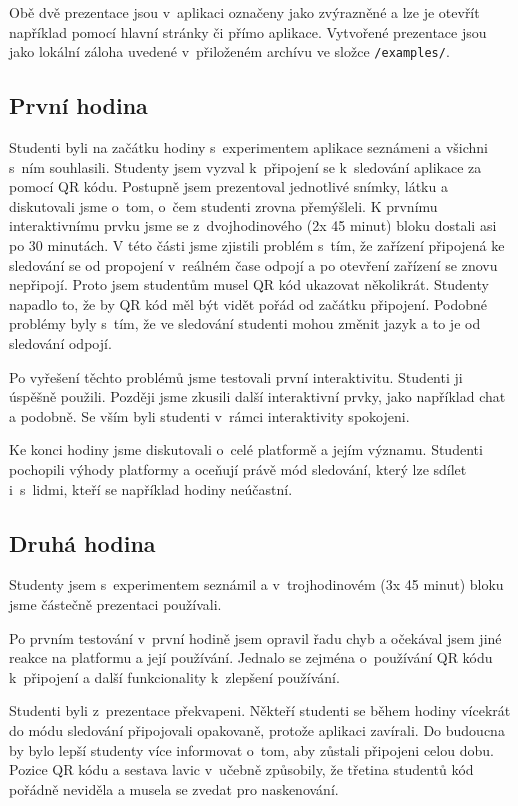 Obě dvě prezentace jsou v~aplikaci označeny jako zvýrazněné a lze je otevřít například pomocí hlavní stránky či přímo aplikace.
Vytvořené prezentace jsou jako lokální záloha uvedené v~přiloženém archívu ve složce \verb|/examples/|.

\subsection{První hodina}

Studenti byli na začátku hodiny s~experimentem aplikace seznámeni a všichni s~ním souhlasili.
Studenty jsem vyzval k~připojení se k~sledování aplikace za pomocí QR kódu.
Postupně jsem prezentoval jednotlivé snímky, látku a diskutovali jsme o~tom, o~čem studenti zrovna přemýšleli.
K prvnímu interaktivnímu prvku jsme se z~dvojhodinového (2x 45 minut) bloku dostali asi po 30 minutách.
V této části jsme zjistili problém s~tím, že zařízení připojená ke sledování se od propojení v~reálném čase odpojí a po otevření zařízení se znovu nepřipojí.
Proto jsem studentům musel QR kód ukazovat několikrát.
Studenty napadlo to, že by QR kód měl být vidět pořád od začátku připojení.
Podobné problémy byly s~tím, že ve sledování studenti mohou změnit jazyk a to je od sledování odpojí.

Po vyřešení těchto problémů jsme testovali první interaktivitu.
Studenti ji úspěšně použili.
Později jsme zkusili další interaktivní prvky, jako například chat a podobně.
Se vším byli studenti v~rámci interaktivity spokojeni.

Ke konci hodiny jsme diskutovali o~celé platformě a jejím významu.
Studenti pochopili výhody platformy a oceňují právě mód sledování, který lze sdílet i~s~lidmi, kteří se například hodiny neúčastní.

\subsection{Druhá hodina}

Studenty jsem s~experimentem seznámil a v~trojhodinovém (3x 45 minut) bloku jsme částečně prezentaci používali.

Po prvním testování v~první hodině jsem opravil řadu chyb a očekával jsem jiné reakce na platformu a její používání.
Jednalo se zejména o~používání QR kódu k~připojení a další funkcionality k~zlepšení používání. 

Studenti byli z~prezentace překvapeni. 
Někteří studenti se během hodiny vícekrát do módu sledování připojovali opakovaně, protože aplikaci zavírali.
Do budoucna by bylo lepší studenty více informovat o~tom, aby zůstali připojeni celou dobu.
Pozice QR kódu a sestava lavic v~učebně způsobily, že třetina studentů kód pořádně neviděla a musela se zvedat pro naskenování.

